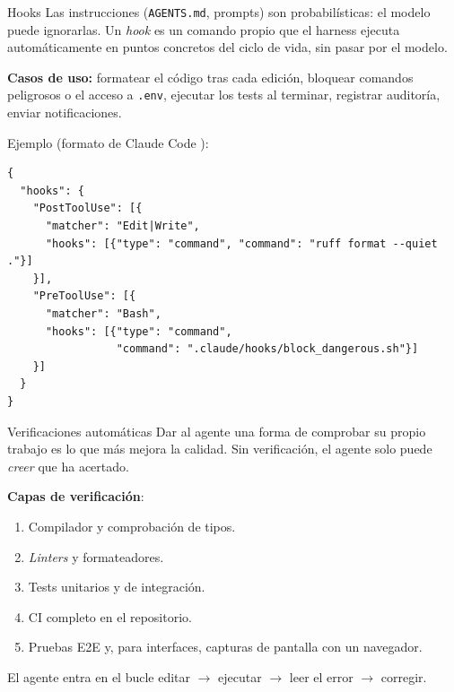 \begin{frame}[fragile]{Hooks}
Las instrucciones (\texttt{AGENTS.md}, prompts) son \alert{probabilísticas}: el modelo puede ignorarlas. Un \alert{\textit{hook}} es un \alert{comando propio que el harness ejecuta automáticamente} en puntos concretos del ciclo de vida, \alert{sin pasar por el modelo}.
 
\textbf{Casos de uso:} formatear el código tras cada edición, bloquear comandos peligrosos o el acceso a \texttt{.env}, ejecutar los tests al terminar, registrar auditoría, enviar notificaciones.

Ejemplo (formato de Claude Code \cite{claudecodedocs}):
\vspace{-2em}
\begin{block}{}
\tiny
\begin{verbatim}
{
  "hooks": {
    "PostToolUse": [{
      "matcher": "Edit|Write",
      "hooks": [{"type": "command", "command": "ruff format --quiet ."}]
    }],
    "PreToolUse": [{
      "matcher": "Bash",
      "hooks": [{"type": "command",
                 "command": ".claude/hooks/block_dangerous.sh"}]
    }]
  }
}
\end{verbatim}
\end{block}
\end{frame}
 
\begin{frame}{Verificaciones automáticas}
Dar al agente \alert{una forma de comprobar su propio trabajo} es lo que más mejora la calidad. Sin verificación, el agente solo puede \textit{creer} que ha acertado.
 
\textbf{Capas de verificación}:
\begin{enumerate}
    \item \alert{Compilador y comprobación de tipos.}
    \item \alert{\textit{Linters} y formateadores.}
    \item \alert{Tests unitarios y de integración.}
    \item \alert{CI} completo en el repositorio.
    \item \alert{Pruebas E2E} y, para interfaces, capturas de pantalla con un navegador.
\end{enumerate}
 
El agente entra en el bucle \alert{editar $\rightarrow$ ejecutar $\rightarrow$ leer el error $\rightarrow$ corregir}.
\end{frame}
 
